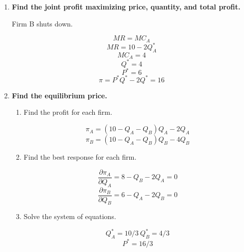 \documentclass{article}
\begin{document}
\begin{enumerate}
    \item \textbf{Find the joint profit maximizing price, quantity, and total
            profit.}
    
    Firm B shuts down.
    
    $$MR=MC_{A}$$
    $$MR=10-2Q_{A}^{*}$$
    $$MC_{A}=4$$
    $$Q^{*}=4$$
    $$P^{*}=6$$
    $$\pi=P^{*}Q^{*}-2Q^{*}=16$$
    
    \item \textbf{Find the equilibrium price.}
    
    \begin{enumerate}[i]
        \item Find the profit for each firm.
        
        $$\pi_{A}=(10-Q_{A}-Q_{B})Q_{A}-2Q_{A}$$
        $$\pi_{B}=(10-Q_{A}-Q_{B})Q_{B}-4Q_{B}$$
        
        \item Find the best response for each firm.
        
        $$\frac{\partial \pi_{A}}{\partial Q_{A}}=8-Q_{B}-2Q_{A}=0$$
        $$\frac{\partial \pi_{B}}{\partial Q_{B}}=6-Q_{A}-2Q_{B}=0$$
        
        \item Solve the system of equations.
        
        $$Q_{A}^{*}=10/3\ Q_{B}^{*}=4/3$$
        $$P^{*}=16/3$$
        
    \end{enumerate}
    
    
    
\end{enumerate}
\end{document}
